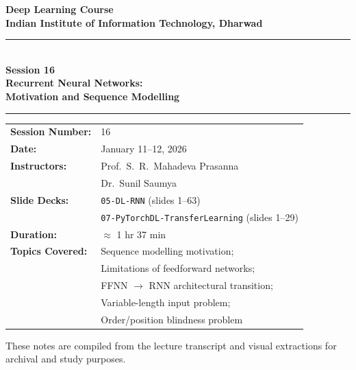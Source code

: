 \documentclass[12pt,a4paper]{article}
\begin{document}
\begin{titlepage}
  \centering
  \vspace*{2cm}

  {\LARGE\bfseries Deep Learning Course\\[0.4em]
   Indian Institute of Information Technology, Dharwad}

  \vspace{1.5cm}
  \rule{\linewidth}{0.8pt}\\[0.4em]
  {\Huge\bfseries Session 16}\\[0.5em]
  {\Large\bfseries Recurrent Neural Networks:\\[0.3em]
   Motivation and Sequence Modelling}
  \\[0.4em]\rule{\linewidth}{0.8pt}

  \vspace{1.5cm}

  \begin{tabular}{ll}
    \textbf{Session Number:}  & 16 \\[4pt]
    \textbf{Date:}            & January 11--12, 2026 \\[4pt]
    \textbf{Instructors:}     & Prof.\ S.\ R.\ Mahadeva Prasanna \\
                              & Dr.\ Sunil Saumya \\[4pt]
    \textbf{Slide Decks:}     & \texttt{05-DL-RNN} (slides 1--63) \\
                              & \texttt{07-PyTorchDL-TransferLearning} (slides 1--29) \\[4pt]
    \textbf{Duration:}        & $\approx$ 1 hr 37 min \\[4pt]
    \textbf{Topics Covered:}  & Sequence modelling motivation; \\
                              & Limitations of feedforward networks; \\
                              & FFNN $\to$ RNN architectural transition; \\
                              & Variable-length input problem; \\
                              & Order/position blindness problem \\
  \end{tabular}

  \vfill
  {\small These notes are compiled from the lecture transcript and visual
   extractions for archival and study purposes.}
\end{titlepage}
\end{document}
